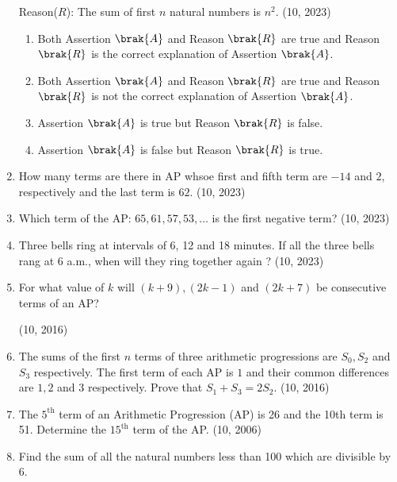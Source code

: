 \begin{enumerate}[label=\thesubsection.\arabic*,ref=\thesubsection.\theenumi,itemsep=1pt]
%
{Reason($R$):} The sum of first $n$ natural numbers is $n^2$.
\hfill (10, 2023)
\begin{enumerate}
\item Both Assertion $\brak{A}$ and Reason $\brak{R}$ are true and Reason $\brak{R}$ is the correct explanation of Assertion $\brak{A}$.
\item Both Assertion $\brak{A}$ and Reason $\brak{R}$ are true and Reason $\brak{R}$ is not the correct explanation of Assertion $\brak{A}$.
\item Assertion $\brak{A}$ is true but Reason $\brak{R}$ is false.
\item Assertion $\brak{A}$ is false but Reason $\brak{R}$ is true.
\end{enumerate}
\item
How many terms are there in  AP  whsoe first and fifth term are $-14$ and $2$, respectively and the last term is $62$.
\hfill (10, 2023)
\item
Which term of the AP: $65,61,57,53, \dots$ is the first negative term?
\hfill (10, 2023)
\item Three bells ring at intervals of  6, 12 and 18 minutes. If all the three bells rang at  6 a.m., when will they ring together again ?
\hfill (10, 2023)
\item For what value of $k$ will $(k+9), (2k-1)$ and $( 2k+7)$ be consecutive terms of an AP?

\hfill (10, 2016)
\item The sums of the first $n$ terms of three arithmetic progressions are $S_0, S_2$ and $S_3$ respectively. The first term of each AP is $1$ and their common differences are $1, 2$ and $3$ respectively. Prove that $S_1 + S_3 = 2S_2$.
								\hfill (10, 2016)
\item The $5^{\text{th}}$ term of an Arithmetic Progression (AP) is 26 and the 10th term is 51. Determine the $15^{\text{th}}$ term of the AP.
    \hfill (10, 2006)
\item Find the sum of all the natural numbers less than 100 which are divisible by 6.


\end{enumerate}
